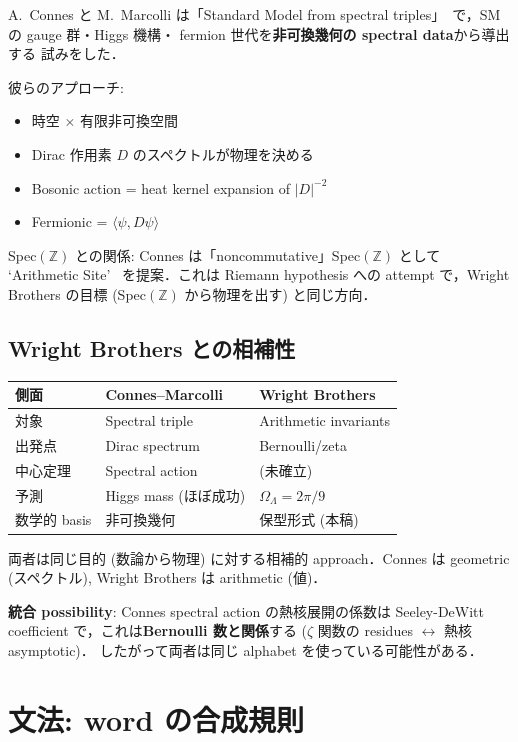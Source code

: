\documentclass[11pt,a4paper]{article}
\begin{document}
A.~Connes と M.~Marcolli は「Standard Model from spectral
triples」~\cite{ConnesMarcolli2008}で，SM の gauge 群・Higgs 機構・
fermion 世代を\textbf{非可換幾何の spectral data}から導出する
試みをした．

彼らのアプローチ:
\begin{itemize}
\item 時空 $\times$ 有限非可換空間
\item Dirac 作用素 $D$ のスペクトルが物理を決める
\item Bosonic action = heat kernel expansion of $|D|^{-2}$
\item Fermionic = $\langle\psi, D\psi\rangle$
\end{itemize}

Spec$(\mathbb{Z})$ との関係: Connes は「noncommutative」Spec$(\mathbb{Z})$
として `Arithmetic Site'~\cite{ConnesConsani2014} を提案．これは
Riemann hypothesis への attempt で，Wright Brothers の目標 (Spec$(\mathbb{Z})$
から物理を出す) と同じ方向．

\subsection{Wright Brothers との相補性}

\begin{center}
\begin{tabular}{lll}
\toprule
側面 & Connes--Marcolli & Wright Brothers \\
\midrule
対象 & Spectral triple & Arithmetic invariants \\
出発点 & Dirac spectrum & Bernoulli/zeta \\
中心定理 & Spectral action & (未確立) \\
予測 & Higgs mass (ほぼ成功) & $\Omega_\Lambda = 2\pi/9$ \\
数学的 basis & 非可換幾何 & 保型形式 (本稿) \\
\bottomrule
\end{tabular}
\end{center}

両者は同じ目的 (数論から物理) に対する相補的 approach．Connes は
geometric (スペクトル), Wright Brothers は arithmetic (値)．

\textbf{統合 possibility}: Connes spectral action の熱核展開の係数は
Seeley-DeWitt coefficient で，これは\textbf{Bernoulli 数と関係}する
($\zeta$ 関数の residues $\leftrightarrow$ 熱核 asymptotic)．
したがって両者は同じ alphabet を使っている可能性がある．

\section{文法: word の合成規則}
\end{document}
